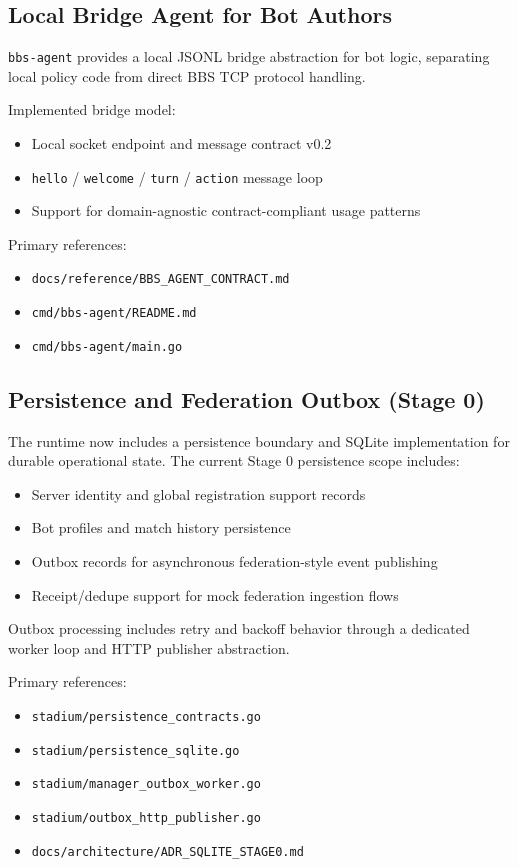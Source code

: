 \documentclass[11pt]{article}
\begin{document}
\subsection{Local Bridge Agent for Bot Authors}
\texttt{bbs-agent} provides a local JSONL bridge abstraction for bot logic, separating local policy code from direct BBS TCP protocol handling.

Implemented bridge model:
\begin{itemize}[leftmargin=*]
  \item Local socket endpoint and message contract v0.2
  \item \texttt{hello} / \texttt{welcome} / \texttt{turn} / \texttt{action} message loop
  \item Support for domain-agnostic contract-compliant usage patterns
\end{itemize}

Primary references:
\begin{itemize}[leftmargin=*]
  \item \texttt{docs/reference/BBS\_AGENT\_CONTRACT.md}
  \item \texttt{cmd/bbs-agent/README.md}
  \item \texttt{cmd/bbs-agent/main.go}
\end{itemize}

\subsection{Persistence and Federation Outbox (Stage 0)}
The runtime now includes a persistence boundary and SQLite implementation for durable operational state. The current Stage 0 persistence scope includes:
\begin{itemize}[leftmargin=*]
  \item Server identity and global registration support records
  \item Bot profiles and match history persistence
  \item Outbox records for asynchronous federation-style event publishing
  \item Receipt/dedupe support for mock federation ingestion flows
\end{itemize}

Outbox processing includes retry and backoff behavior through a dedicated worker loop and HTTP publisher abstraction.

Primary references:
\begin{itemize}[leftmargin=*]
  \item \texttt{stadium/persistence\_contracts.go}
  \item \texttt{stadium/persistence\_sqlite.go}
  \item \texttt{stadium/manager\_outbox\_worker.go}
  \item \texttt{stadium/outbox\_http\_publisher.go}
  \item \texttt{docs/architecture/ADR\_SQLITE\_STAGE0.md}
\end{itemize}
\end{document}
